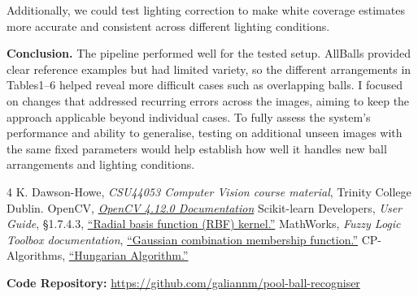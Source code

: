 \documentclass[12pt,a4paper]{article}
\begin{document}
Additionally, we could test lighting correction to make white coverage estimates more 
accurate and consistent across different lighting conditions.

\textbf{Conclusion.} 
The pipeline performed well for the tested setup. AllBalls provided clear reference examples but had 
limited variety, so the different arrangements in Tables1--6 helped reveal more difficult cases such as overlapping balls.
I focused on changes that addressed recurring errors across the images, aiming to keep the approach 
applicable beyond individual cases.
To fully assess the system’s performance and ability to generalise, testing on additional unseen images with the same fixed parameters would help establish how well it
handles new ball arrangements and lighting conditions.

\begin{thebibliography}{4}
\setlength{\itemsep}{2pt}
 K. Dawson-Howe, \emph{CSU44053 Computer Vision course material},
Trinity College Dublin.
OpenCV,
\href{https://docs.opencv.org/4.12.0/}
{\emph{OpenCV 4.12.0 Documentation}}
 Scikit-learn Developers, \emph{User Guide}, \S1.7.4.3,
\href{https://scikit-learn.org/stable/modules/gaussian_process.html\#radial-basis-function-rbf-kernel}{``Radial basis function (RBF) kernel.''}
 MathWorks, \emph{Fuzzy Logic Toolbox documentation},
\href{https://www.mathworks.com/help/fuzzy/gauss2mf.html}{``Gaussian combination membership function.''}
 CP-Algorithms,
\href{https://cp-algorithms.com/graph/hungarian-algorithm.html}{``Hungarian Algorithm.''}
\end{thebibliography}

\textbf{Code Repository:} \url{https://github.com/galiannm/pool-ball-recogniser}
\end{document}
